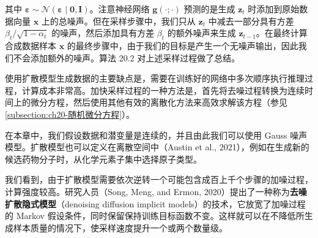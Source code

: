 \documentclass[../../main.tex]{subfiles}
\begin{document}
其中 $\bm{\varepsilon}\sim\mathcal{N}(\bm{\varepsilon}\mid\bm{0},\bm{I})$。注意神经网络 $\bm{g}(\cdot;\cdot)$ 预测的是生成 $\bm{z}_t$ 时添加到原始数据向量 $\bm{x}$ 上的总噪声。但在采样步骤中，我们只从 $\bm{z}_t$ 中减去一部分具有方差 $\beta_t/\sqrt{1-\alpha_t}$ 的噪声，然后添加具有方差 $\beta_t$ 的额外噪声来生成 $\bm{z}_{t-1}$。在最终计算合成数据样本 $\bm{x}$ 的最终步骤中，由于我们的目标是产生一个无噪声输出，因此我们不会添加额外的噪声。算法 20.2 对上述采样过程做了总结。

使用扩散模型生成数据的主要缺点是，需要在训练好的网络中多次顺序执行推理过程，计算成本非常高。加快采样过程的一种方法是，首先将去噪过程转换为连续时间上的微分方程，然后使用其他有效的离散化方法来高效求解该方程（参见\cref{subsection:ch20-随机微分方程}）。

在本章中，我们假设数据和潜变量是连续的，并且由此我们可以使用 Gauss 噪声模型。扩散模型也可以定义在离散空间中（Austin et al., 2021），例如在生成新的候选药物分子时，从化学元素子集中选择原子类型。

\begin{center}
\end{center}

我们看到，由于扩散模型需要依次逆转一个可能包含成百上千个步骤的加噪过程，计算强度较高。研究人员（Song, Meng, and Ermon, 2020）提出了一种称为\textbf{去噪扩散隐式模型}（denoising diffusion implicit models）的技术，它放宽了加噪过程的 Markov 假设条件，同时保留保持训练目标函数不变。这样就可以在不降低所生成样本质量的情况下，使采样速度提升一个或两个数量级。
\end{document}

